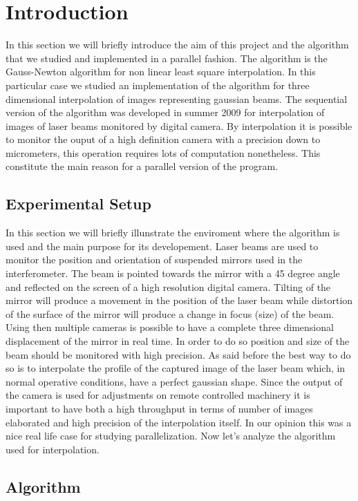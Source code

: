 \section{Introduction}  

In this section we will briefly introduce the aim of this project and the algorithm that we studied and implemented in a parallel fashion.
The algorithm is the Gauss-Newton algorithm for non linear least square interpolation.
In this particular case we studied an implementation of the algorithm for three dimensional interpolation of images representing gaussian beams.
The sequential version of the algorithm was developed in summer 2009 for interpolation of images of laser beams monitored by digital camera. 
By interpolation it is possible to monitor the ouput of a high definition camera with a precision down to micrometers, this operation requires lots of computation nonetheless.
This constitute the main reason for a parallel version of the program.

\subsection{Experimental Setup}

In this section we will briefly illunstrate the enviroment where the algorithm is used and the main purpose for its developement.
Laser beams are used to monitor the position and orientation of suspended mirrors used in the interferometer. 
The beam is pointed towards the mirror with a 45 degree angle and reflected on the screen of a high resolution digital camera.
Tilting of the mirror will produce a movement in the position of the laser beam while distortion of the surface of the mirror will produce a change in focus (size) of the beam.
Using then multiple cameras is possible to have a complete three dimensional displacement of the mirror in real time.
In order to do so position and size of the beam should be monitored with high precision. 
As said before the best way to do so is to interpolate the profile of the captured image of the laser beam which, in normal operative conditions, have a perfect gaussian shape.
Since the output of the camera is used for adjustments on remote controlled machinery it is important to have both a high throughput in terms of number of images elaborated and high precision of the interpolation itself.
In our opinion this was a nice real life case for studying parallelization.
Now let's analyze the algorithm used for interpolation.

\subsection{Algorithm}

